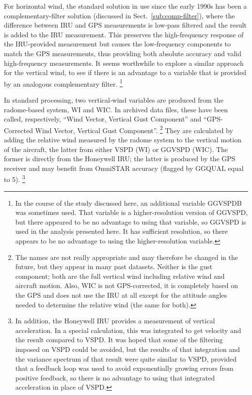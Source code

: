 \documentclass[12pt,twoside,english]{article}\usepackage[]{graphicx}\usepackage[]{color}
\let\OrgIndex\index
\renewcommand*{\index}[1]{\OrgIndex{#1}}
\begin{document}
{{For horizontal wind, the standard solution in use since the early 1990s has been a complementary-filter solution (discussed in Sect.~\ref{sub:comp-filter}), where the difference between IRU and GPS measurements is low-pass filtered and the result is added to the IRU measurement. This preserves the high-frequency response of the IRU-provided measurement but causes the low-frequency components to match the GPS measurements, thus providing both absolute accuracy and valid high-frequency measurements. It seems worthwhile to explore a similar approach for the vertical wind, to see if there is an advantage to a variable that is provided by an analogous complementary filter.  \footnote{In the course of the study discussed here, an additional variable
GGVSPDB was
sometimes used. That variable is a higher-resolution version of GGVSPD,
but there appeared to be no advantage to using that variable, so GGVSPD
is used in the analysis presented here. It has sufficient resolution,
so there appears to be no advantage to using the higher-resolution
variable.}

In standard processing, two vertical-wind variables are produced from
the radome-based system, WI
and WIC.
In archived data files, these have been called, respectively, ``Wind Vector, Vertical Gust Component''
and ``GPS-Corrected Wind Vector, Vertical Gust Component''.%
\footnote{The names are not really appropriate and may therefore be changed in the future, but they
appear in many past datasets. Neither is the gust component; both
are the full vertical wind including relative wind and aircraft motion.
Also, WIC is not GPS-corrected, it is completely based on the GPS
and does not use the IRU at all except for the attitude angles needed
to determine the relative wind (the same for both).}
They are calculated by adding the relative wind measured by the radome
system to the vertical motion of the aircraft, the latter from either VSPD (WI) or
GGVSPD (WIC). The former is directly from the Honeywell IRU; the latter
is produced by the GPS receiver and may benefit from OmniSTAR accuracy
(flagged by GGQUAL equal to 5).%
\footnote{In addition, the Honeywell IRU provides a measurement of vertical acceleration. In a special calculation, this was integrated to get velocity and the result compared to VSPD. It was hoped that some of the filtering imposed on VSPD could be avoided, but the results of that integration and the variance spectrum of that result were quite similar to VSPD, provided that a feedback loop was used to avoid exponentially growing errors from positive feedback, so there is no advantage to using that integrated acceleration in place of VSPD.}%



}}
\end{document}
